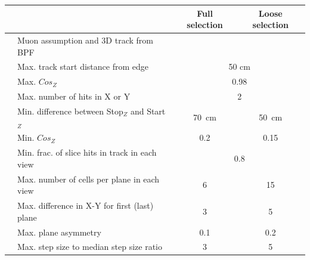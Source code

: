 \documentclass[12pt]{article}
\begin{document}
\begin{table}[!ht]
\centering
\begin{tabular}{clcc}
& \centering{\textbf{Cut}} & \cellcolor[HTML]{3166FF}\textbf{Full selection} & \cellcolor[HTML]{32CB00}\textbf{Loose selection} \\ \hline
                                   & Muon assumption and 3D track from BPF         &                                             &                                          \\
                                   & Max. track start distance from edge                       & \multicolumn{2}{c}{50 cm}                                                                 \\
                                   & Max. $Cos_{Z}$                                            & \multicolumn{2}{c}{0.98}                                                               \\ \hline
                                   & Max. number of hits in X or Y                             & \multicolumn{2}{c}{\cellcolor[HTML]{FFFFFF}2}                                          \\
                                   & Min. difference between Stop$_{Z}$ and Start$_{Z}$        & \cellcolor[HTML]{3166FF}70~cm                 & \cellcolor[HTML]{32CB00}50~cm             \\
                                   & Min. $Cos_{Z}$ & \cellcolor[HTML]{3166FF}0.2                 & \cellcolor[HTML]{32CB00}0.15             \\
                                   & Min. frac. of slice hits in track in each view    & \multicolumn{2}{c}{0.8}                                                                \\
                                   & Max. number of cells per plane in each view               & \cellcolor[HTML]{3166FF}6                   & \cellcolor[HTML]{32CB00}15               \\
                                   & Max. difference in X-Y for first (last) plane     & \cellcolor[HTML]{3166FF}3                   & \cellcolor[HTML]{32CB00}5                \\
                                   & Max. plane asymmetry                                      & \cellcolor[HTML]{3166FF}0.1                 & \cellcolor[HTML]{32CB00}0.2              \\
                                   & Max. step size to median step size ratio                  & \cellcolor[HTML]{3166FF}3                   & \cellcolor[HTML]{32CB00}5                \\

\end{tabular}
\end{table}
\end{document}
